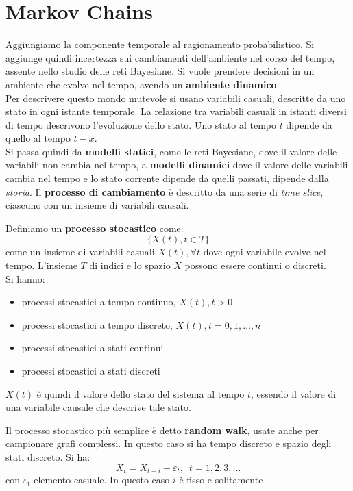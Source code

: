 \documentclass[a4paper,12pt, oneside]{book}
\begin{document}
\chapter{Markov Chains}
Aggiungiamo la componente temporale al ragionamento probabilistico. Si aggiunge
quindi incertezza sui cambiamenti dell'ambiente nel corso del tempo, assente
nello studio delle reti Bayesiane. Si vuole prendere decisioni in un ambiente
che evolve nel tempo, avendo un \textbf{ambiente dinamico}.\\
Per descrivere questo mondo mutevole si usano variabili casuali, descritte da
uno stato in ogni istante temporale. La relazione tra variabili casuali in
istanti diversi di tempo descrivono l'evoluzione dello stato. Uno stato al tempo
$t$ dipende da quello al tempo $t-x$.\\
Si passa quindi da \textbf{modelli statici}, come le reti Bayesiane, dove il
valore delle variabili non cambia nel tempo, a \textbf{modelli dinamici} dove il
valore delle variabili cambia nel tempo e lo stato corrente dipende da quelli
passati, dipende dalla \textit{storia}. Il \textbf{processo di cambiamento} è
descritto da una serie di \textit{time slice}, ciascuno con un insieme di
variabili causali.
\begin{definizione}
  Definiamo un \textbf{processo stocastico} come:
  \[\{X(t), t\in T\}\]
  come un insieme di variabili casuali $X(t),\forall t$ dove ogni variabile
  evolve nel tempo. L'insieme $T$ di indici e lo spazio $X$ possono essere
  continui o discreti.\\
  Si hanno:
  \begin{itemize}
    \item processi stocastici a tempo continuo, $X(t),t>0$
    \item processi stocastici a tempo discreto, $X(t), t=0,1,\ldots,n$
    \item processi stocastici a stati continui
    \item processi stocastici a stati discreti
  \end{itemize}
  $X(t)$ è quindi il valore dello stato del sistema al tempo $t$, essendo il
  valore di una variabile causale che descrive tale stato.
\end{definizione}
Il processo stocastico più semplice è detto \textbf{random walk}, usate anche
per campionare grafi complessi. In questo caso si ha tempo discreto e spazio
degli stati discreto. Si ha:
\[X_t=X_{t-i}+\varepsilon_t,\,\,\,t=1,2,3,\ldots\]
con $\varepsilon_t$ elemento casuale. In questo caso $i$ è fisso e solitamente
\end{document}
